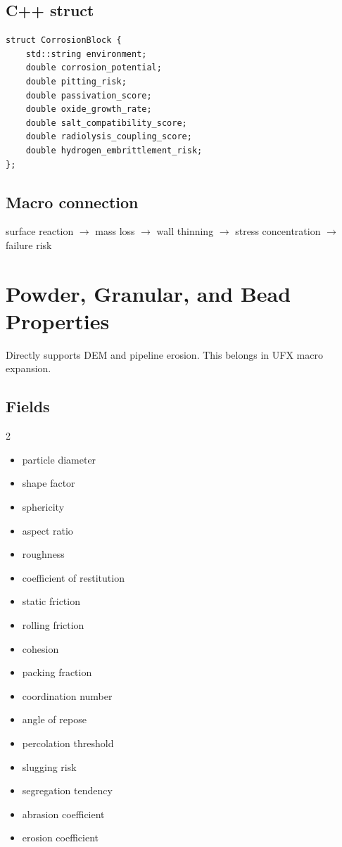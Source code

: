 \documentclass[11pt, a4paper]{article}
\begin{document}
\subsection{C++ struct}

\begin{lstlisting}
struct CorrosionBlock {
    std::string environment;
    double corrosion_potential;
    double pitting_risk;
    double passivation_score;
    double oxide_growth_rate;
    double salt_compatibility_score;
    double radiolysis_coupling_score;
    double hydrogen_embrittlement_risk;
};
\end{lstlisting}

\subsection{Macro connection}

\begin{center}
surface reaction $\rightarrow$ mass loss $\rightarrow$ wall thinning $\rightarrow$ stress concentration $\rightarrow$ failure risk
\end{center}

\section{Powder, Granular, and Bead Properties}

Directly supports DEM and pipeline erosion. This belongs in UFX macro expansion.

\subsection{Fields}

\begin{multicols}{2}
\begin{itemize}[itemsep=1pt, leftmargin=*]
  \item particle diameter
  \item shape factor
  \item sphericity
  \item aspect ratio
  \item roughness
  \item coefficient of restitution
  \item static friction
  \item rolling friction
  \item cohesion
  \item packing fraction
  \item coordination number
  \item angle of repose
  \item percolation threshold
  \item slugging risk
  \item segregation tendency
  \item abrasion coefficient
  \item erosion coefficient
\end{itemize}
\end{multicols}
\end{document}
